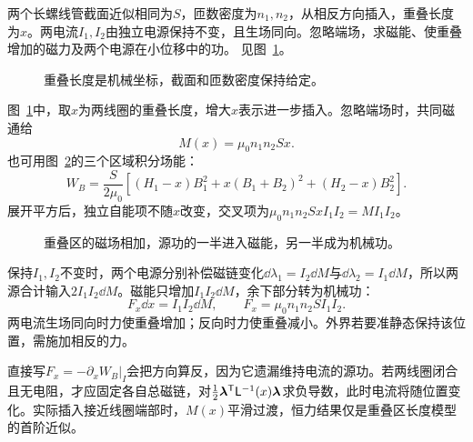 \begin{example}[重叠螺线管的吸力与电源功]\label{ex:i2-e8}
两个长螺线管截面近似相同为$S$，匝数密度为$n_1,n_2$，从相反方向插入，重叠长度为$x$。两电流$I_1,I_2$由独立电源保持不变，且生场同向。忽略端场，求磁能、使重叠增加的磁力及两个电源在小位移中的功。 见图~\ref{fig:i2-e8-q}。
\end{example}

\begin{figure}[H]\centering
{}
\caption{重叠长度是机械坐标，截面和匝数密度保持给定。}\label{fig:i2-e8-q}
\end{figure}
\begin{solution}
图~\ref{fig:i2-e8-q}中，取$x$为两线圈的重叠长度，增大$x$表示进一步插入。忽略端场时，共同磁通给
\[M(x)=\mu_0n_1n_2Sx.
\]
也可用图~\ref{fig:i2-e8-s}的三个区域积分场能：
\[W_B=\frac{S}{2\mu_0}
\left[(H_1-x)B_1^2+x(B_1+B_2)^2+(H_2-x)B_2^2\right].
\]
展开平方后，独立自能项不随$x$改变，交叉项为$\mu_0n_1n_2SxI_1I_2=MI_1I_2$。


\begin{figure}[H]\centering
{}
\caption{重叠区的磁场相加，源功的一半进入磁能，另一半成为机械功。}\label{fig:i2-e8-s}
\end{figure}

保持$I_1,I_2$不变时，两个电源分别补偿磁链变化$\dd\lambda_1=I_2\dd M$与$\dd\lambda_2=I_1\dd M$，所以两源合计输入$2I_1I_2\dd M$。磁能只增加$I_1I_2\dd M$，余下部分转为机械功：
\[F_x\dd x=I_1I_2\dd M,\qquad
\boxed{F_x=\mu_0n_1n_2SI_1I_2}.
\]
两电流生场同向时力使重叠增加；反向时力使重叠减小。外界若要准静态保持该位置，需施加相反的力。

直接写$F_x=-\partial_xW_B|_I$会把方向算反，因为它遗漏维持电流的源功。若两线圈闭合且无电阻，才应固定各自总磁链，对$\frac12\bm{\lambda}^{\mathsf T}\mathsf L^{-1}(x)\bm{\lambda}$求负导数，此时电流将随位置变化。实际插入接近线圈端部时，$M(x)$平滑过渡，恒力结果仅是重叠区长度模型的首阶近似。
\end{solution}


